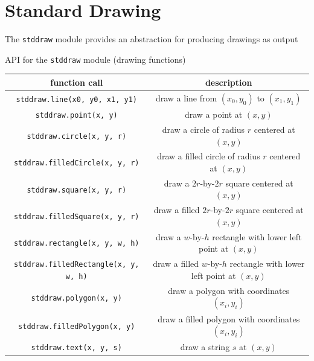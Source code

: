 \documentclass[8pt,a4paper,compress]{beamer}
\begin{document}
\section{Standard Drawing}
\begin{frame}[fragile]
\pause

The \lstinline{stddraw} module provides an abstraction for producing drawings as output

\pause\bigskip

API for the \lstinline{stddraw} module (drawing functions)
\begin{center}
\begin{tabular}{cc}
function call & description \\ \hline
\lstinline$stddraw.line(x0, y0, x1, y1)$ & draw a line from $(x_0, y_0)$ to $(x_1, y_1)$ \\
\lstinline$stddraw.point(x, y)$ & draw a point at $(x, y)$ \\
\lstinline$stddraw.circle(x, y, r)$ & draw a circle of radius $r$ centered at $(x, y)$ \\
\lstinline$stddraw.filledCircle(x, y, r)$ & draw a filled circle of radius $r$ centered at $(x, y)$ \\
\lstinline$stddraw.square(x, y, r)$ & draw a $2r$-by-$2r$ square centered at $(x, y)$ \\
\lstinline$stddraw.filledSquare(x, y, r)$ & draw a filled $2r$-by-$2r$ square centered at $(x, y)$ \\
\lstinline$stddraw.rectangle(x, y, w, h)$ & \makecell{draw a $w$-by-$h$ rectangle \\ with lower left point at $(x, y)$} \\ 
\lstinline$stddraw.filledRectangle(x, y, w, h)$ & \makecell{draw a filled $w$-by-$h$ rectangle \\ with lower left point at $(x, y)$} \\
\lstinline$stddraw.polygon(x, y)$ & draw a polygon with coordinates $(x_i, y_i)$ \\
\lstinline$stddraw.filledPolygon(x, y)$ & draw a filled polygon with coordinates $(x_i, y_i)$ \\
\lstinline$stddraw.text(x, y, s)$ & draw a string $s$ at $(x, y)$ \\
\end{tabular} 
\end{center}
\end{frame}
\end{document}
